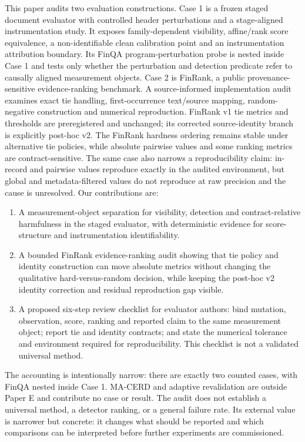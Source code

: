 \documentclass[10pt,conference]{IEEEtran}
\begin{document}
This paper audits two evaluation constructions. Case 1 is a frozen staged document evaluator with controlled header perturbations and a stage-aligned instrumentation study. It exposes family-dependent visibility, affine/rank score equivalence, a non-identifiable clean calibration point and an instrumentation attribution boundary. Its FinQA program-perturbation probe is nested inside Case 1 and tests only whether the perturbation and detection predicate refer to causally aligned measurement objects. Case 2 is FinRank, a public provenance-sensitive evidence-ranking benchmark. A source-informed implementation audit examines exact tie handling, first-occurrence text/source mapping, random-negative construction and numerical reproduction. FinRank v1 tie metrics and thresholds are preregistered and unchanged; its corrected source-identity branch is explicitly post-hoc v2. The FinRank hardness ordering remains stable under alternative tie policies, while absolute pairwise values and some ranking metrics are contract-sensitive. The same case also narrows a reproducibility claim: in-record and pairwise values reproduce exactly in the audited environment, but global and metadata-filtered values do not reproduce at raw precision and the cause is unresolved.
Our contributions are:
\begin{enumerate}
\item A measurement-object separation for visibility, detection and contract-relative harmfulness in the staged evaluator, with deterministic evidence for score-structure and instrumentation identifiability.
\item A bounded FinRank evidence-ranking audit showing that tie policy and identity construction can move absolute metrics without changing the qualitative hard-versus-random decision, while keeping the post-hoc v2 identity correction and residual reproduction gap visible.
\item A proposed six-step review checklist for evaluator authors: bind mutation, observation, score, ranking and reported claim to the same measurement object; report tie and identity contracts; and state the numerical tolerance and environment required for reproducibility. This checklist is not a validated universal method.
\end{enumerate}
The accounting is intentionally narrow: there are exactly two counted cases, with FinQA nested inside Case 1. MA-CERD and adaptive revalidation are outside Paper E and contribute no case or result. The audit does not establish a universal method, a detector ranking, or a general failure rate. Its external value is narrower but concrete: it changes what should be reported and which comparisons can be interpreted before further experiments are commissioned.
\end{document}
